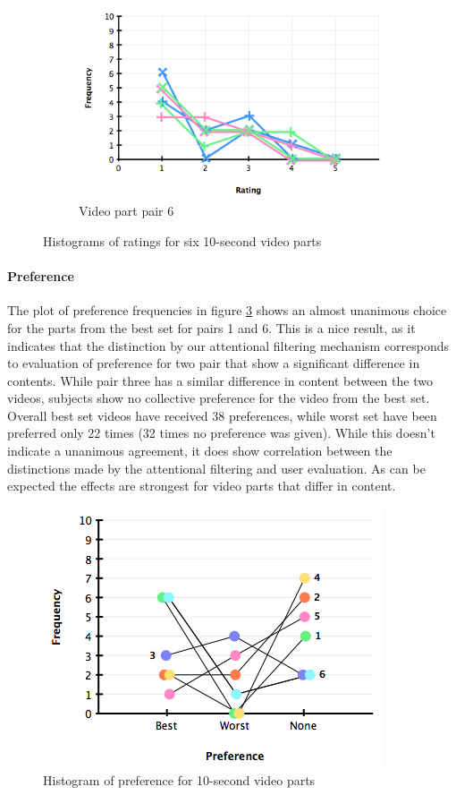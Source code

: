 \begin{figure}
\begin{subfigure}[b]{.32\textwidth}
      \includegraphics[width=\textwidth]{img/evaluation/hist_video6}
    \caption{Video part pair 6}
    \label{fig:evalVideo6}
  \end{subfigure}

  \caption{Histograms of ratings for six 10-second video parts}
  \label{fig:evalVideos}
\end{figure}

\paragraph{Preference}

The plot of preference frequencies in figure \ref{fig:evalVideosPref} shows an almost unanimous choice for the parts from the best set for pairs 1 and 6. This is a nice result, as it indicates that the distinction by our attentional filtering mechanism corresponds to evaluation of preference for two pair that show a significant difference in contents. While pair three has a similar difference in content between the two videos, subjects show no collective preference for the video from the best set. Overall best set videos have received 38 preferences, while worst set have been preferred only 22 times (32 times no preference was given). While this doesn't indicate a unanimous agreement, it does show correlation between the distinctions made by the attentional filtering and user evaluation. As can be expected the effects are strongest for video parts that differ in content.

\begin{figure}[htbp]
  \centering
    \includegraphics[width=.6\textwidth]{img/evaluation/pref_videos_all}
  \caption{Histogram of preference for 10-second video parts}
  \label{fig:evalVideosPref}
\end{figure}
 

